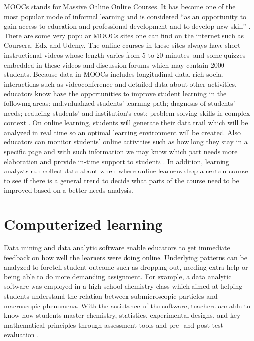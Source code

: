 \documentclass[sigconf]{acmart}
\begin{document}
MOOCs stands for Massive Online Online Courses. It has become one of the most popular mode of informal learning and is considered ``as an opportunity to gain access to education and professional development and to develop new skill'' \cite{Dillahunt2014}. There are some very popular MOOCs sites one can find on the internet such as Coursera, Edx and Udemy. The online courses in these sites always have short instructional videos whose length varies from 5 to 20 minutes, and some quizzes embedded in these videos and discussion forums which may contain 2000 students.
Because data in MOOCs includes longitudinal data, rich social interactions such as videoconference and detailed data about other activities, educators know have the opportunities to improve student learning in the following areas: individualized students’ learning path; diagnosis of students’ needs; reducing students’ and institution’s cost; problem-solving skills in complex context \cite{Dede2016}. On online learning, students will generate their data trail which will be analyzed in real time so an optimal learning environment will be created. Also educators can monitor students’ online activities such as how long they stay in a specific page and with such information we may know which part needs more elaboration and provide in-time support to students \cite{Rijmenam2016}. In addition, learning analysts can collect data about when  where online learners drop a certain course to see if there is a general trend to decide what parts of the course need to be improved based on a better needs analysis.

\section{Computerized learning}
Data mining and data analytic software enable educators to get immediate feedback on how well the learners were doing online. Underlying patterns can be analyzed to foretell student outcome such as dropping out, needing extra help or being able to do more demanding assignment. For example, a data analytic software was employed in a high school chemistry class which aimed at helping students understand the relation between submicroscopic particles and macroscopic phenomena. With the assistance of the software, teachers are able to know how students master chemistry, statistics, experimental designs, and key mathematical principles through assessment tools and pre- and post-test evaluation \cite{West2012}.
\end{document}
